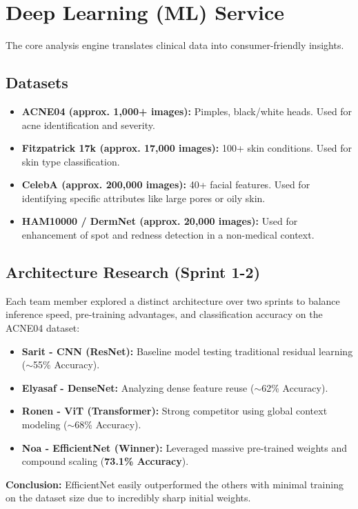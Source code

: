 \documentclass[12pt,a4paper]{article}
\begin{document}
\section{Deep Learning (ML) Service}
The core analysis engine translates clinical data into consumer-friendly insights. 

\subsection{Datasets}
\begin{itemize}
    \item \textbf{ACNE04 (approx. 1,000+ images):} Pimples, black/white heads. Used for acne identification and severity.
    \item \textbf{Fitzpatrick 17k (approx. 17,000 images):} 100+ skin conditions. Used for skin type classification.
    \item \textbf{CelebA (approx. 200,000 images):} 40+ facial features. Used for identifying specific attributes like large pores or oily skin.
    \item \textbf{HAM10000 / DermNet (approx. 20,000 images):} Used for enhancement of spot and redness detection in a non-medical context.
\end{itemize}

\subsection{Architecture Research (Sprint 1-2)}
Each team member explored a distinct architecture over two sprints to balance inference speed, pre-training advantages, and classification accuracy on the ACNE04 dataset:
\begin{itemize}
    \item \textbf{Sarit - CNN (ResNet):} Baseline model testing traditional residual learning ($\sim$55\% Accuracy).
    \item \textbf{Elyasaf - DenseNet:} Analyzing dense feature reuse ($\sim$62\% Accuracy).
    \item \textbf{Ronen - ViT (Transformer):} Strong competitor using global context modeling ($\sim$68\% Accuracy).
    \item \textbf{Noa - EfficientNet (Winner):} Leveraged massive pre-trained weights and compound scaling (\textbf{73.1\% Accuracy}).
\end{itemize}
\textbf{Conclusion:} EfficientNet easily outperformed the others with minimal training on the dataset size due to incredibly sharp initial weights.
\end{document}
